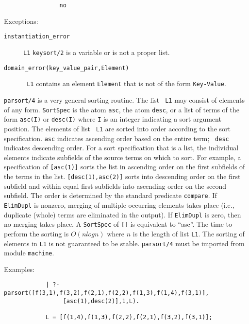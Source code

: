 \begin{description}
{\begin{verbatim}
                no \end{verbatim}}
     Exceptions: 
\begin{description} 
\item[{\tt instantiation\_error}]
     {\tt L1} {\tt keysort/2} is a variable or is not a proper
     list.  
\item[{\tt domain\_error(key\_value\_pair,Element)}] {\tt
     L1} contains an element {\tt Element} that is not of the
     form \verb'Key-Value'.  
\end{description}


    {\tt parsort/4} is a very general sorting routine.  The list {\tt
    L1} may consist of elements of any form.  {\tt SortSpec} is the
    atom {\tt asc}, the atom {\tt desc}, or a list of terms of the
    form {\tt asc(I)} or {\tt desc(I)} where {\tt I} is an integer
    indicating a sort argument position.  The elements of list {\tt
    L1} are sorted into order according to the sort specification.
    {\tt asc} indicates ascending order based on the entire term; {\tt
    desc} indicates descending order.  For a sort specification that
    is a list, the individual elements indicate subfields of the
    source terms on which to sort.  For example, a specification of
    {\tt [asc(1)]} sorts the list in ascending order on the first
    subfields of the terms in the list.  {\tt [desc(1),asc(2)]} sorts
    into descending order on the first subfield and within equal first
    subfields into ascending order on the second subfield.  The order
    is determined by the standard predicate {\tt compare}.  If {\tt
    ElimDupl} is nonzero, merging of multiple occurring elements takes
    place (i.e., duplicate (whole) terms are eliminated in the
    output).  If {\tt ElimDupl} is zero, then no merging takes place.
    A {\tt SortSpec} of {\tt []} is equivalent to ``asc''.  The time
    to perform the sorting is $O(n log n)$ where $n$ is the length of
    list {\tt L1}.  The sorting of elements in {\tt L1} is not
    guaranteed to be stable. {\tt parsort/4} must be imported from
    module {\tt machine}.

    Examples:
    {\footnotesize
     \begin{verbatim}
            | ?- parsort([f(3,1),f(3,2),f(2,1),f(2,2),f(1,3),f(1,4),f(3,1)],
                 [asc(1),desc(2)],1,L). 

            L = [f(1,4),f(1,3),f(2,2),f(2,1),f(3,2),f(3,1)];


\end{verbatim}}
\end{description}
